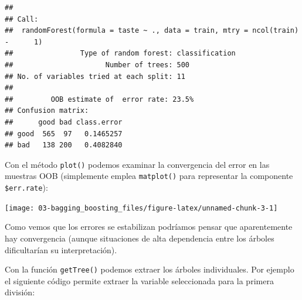 \documentclass[
]{book}
\newenvironment{Shaded}{\begin{snugshade}}{\end{snugshade}}
\newcommand{\CommentTok}[1]{\textcolor[rgb]{0.56,0.35,0.01}{\textit{#1}}}
\newcommand{\ControlFlowTok}[1]{\textcolor[rgb]{0.13,0.29,0.53}{\textbf{#1}}}
\newcommand{\DataTypeTok}[1]{\textcolor[rgb]{0.13,0.29,0.53}{#1}}
\newcommand{\DecValTok}[1]{\textcolor[rgb]{0.00,0.00,0.81}{#1}}
\newcommand{\KeywordTok}[1]{\textcolor[rgb]{0.13,0.29,0.53}{\textbf{#1}}}
\newcommand{\NormalTok}[1]{#1}
\newcommand{\OperatorTok}[1]{\textcolor[rgb]{0.81,0.36,0.00}{\textbf{#1}}}
\newcommand{\OtherTok}[1]{\textcolor[rgb]{0.56,0.35,0.01}{#1}}
\newcommand{\StringTok}[1]{\textcolor[rgb]{0.31,0.60,0.02}{#1}}
\theoremstyle{break}
\theoremstyle{definition}
\theoremstyle{definition}
\theoremstyle{definition}
\theoremstyle{remark}
\begin{document}
\begin{verbatim}
## 
## Call:
##  randomForest(formula = taste ~ ., data = train, mtry = ncol(train) -      1) 
##                Type of random forest: classification
##                      Number of trees: 500
## No. of variables tried at each split: 11
## 
##         OOB estimate of  error rate: 23.5%
## Confusion matrix:
##      good bad class.error
## good  565  97   0.1465257
## bad   138 200   0.4082840
\end{verbatim}

Con el método \texttt{plot()} podemos examinar la convergencia del error en las muestras OOB (simplemente emplea \texttt{matplot()} para representar la componente \texttt{\$err.rate}):

\begin{Shaded}
\end{Shaded}

\begin{center}\texttt{[image: 03-bagging\_boosting\_files/figure-latex/unnamed-chunk-3-1]} \end{center}

Como vemos que los errores se estabilizan podríamos pensar que aparentemente hay convergencia (aunque situaciones de alta dependencia entre los árboles dificultarían su interpretación).

Con la función \texttt{getTree()} podemos extraer los árboles individuales.
Por ejemplo el siguiente código permite extraer la variable seleccionada para la primera división:

\begin{Shaded}
\end{Shaded}
\end{document}
